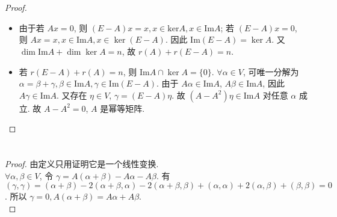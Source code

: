 \documentclass{article}
\begin{document}
\section{}

\begin{proof}
    \begin{itemize}
        \item 由于若 $Ax = 0$, 则 $(E - A)x = x, x \in \mathrm{ker} A, x \in \mathrm{Im}A$; 若 $(E - A)x = 0$, 则 $Ax = x, x \in \mathrm{Im}A, x \in \ker (E - A)$. 因此 $\mathrm{Im}(E - A) = \ker A$. 又 $\dim\mathrm{Im}A + \dim \ker A = n$, 故 $r(A) + r(E - A) = n$.
        \item 若 $r(E - A) + r(A) = n$, 则 $\mathrm{Im}A \cap \ker A = \{0\}$. $\forall \alpha \in V$, 可唯一分解为 $\alpha = \beta + \gamma, \beta \in \mathrm{Im}A, \gamma \in \mathrm{Im}(E - A)$. 由于 $A\alpha \in \mathrm{Im}A$, $A\beta \in \mathrm{Im}A$, 因此 $A\gamma \in \mathrm{Im}A$. 又存在 $\eta \in V$, $\gamma = (E - A)\eta$. 故 $(A - A^2)\eta \in \mathrm{Im}A$ 对任意 $\alpha$ 成立. 故 $A - A^2 = 0$, $A$ 是幂等矩阵.
    \end{itemize}
\end{proof}

\section{}

\begin{proof}
    由定义只用证明它是一个线性变换. \\
    $\forall \alpha, \beta \in V$, 令 $\gamma = A(\alpha + \beta) - A\alpha - A\beta$. 有 $(\gamma, \gamma) = (\alpha + \beta) - 2(\alpha + \beta, \alpha) - 2(\alpha + \beta, \beta) + (\alpha, \alpha) + 2(\alpha, \beta) + (\beta, \beta) = 0$. 所以 $\gamma = 0, A(\alpha + \beta) = A\alpha + A\beta$. \\
    
\end{proof}

\section{}
\end{document}
